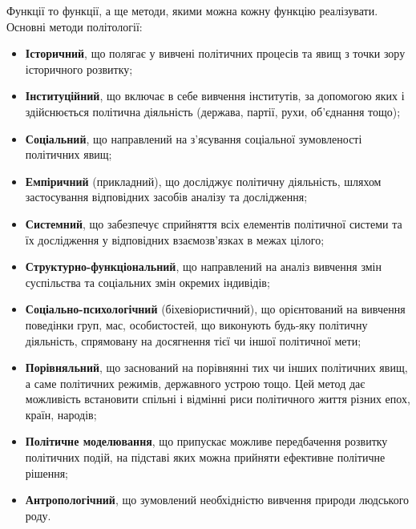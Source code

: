 Функції то функції, а ще методи, якими можна кожну функцію реалізувати. Основні методи політології:
\begin{itemize}
\item {\bf Історичний}, що полягає у вивчені політичних процесів та явищ з точки зору історичного розвитку;
\item {\bf Інституційний}, що включає в себе вивчення інститутів, за допомогою яких і здійснюється політична діяльність (держава, партії, рухи, об’єднання тощо);
\item {\bf Соціальний}, що направлений на з’ясування соціальної зумовленості політичних явищ;
\item {\bf Емпіричний} (прикладний), що досліджує політичну діяльність, шляхом застосування відповідних засобів аналізу та дослідження;
\item {\bf Системний}, що забезпечує сприйняття всіх елементів політичної системи та їх дослідження у відповідних взаємозв’язках в межах цілого;
\item {\bf Структурно-функціональний}, що направлений на аналіз вивчення змін суспільства та соціальних змін окремих індивідів;
\item {\bf Соціально-психологічний} (біхевіористичний), що орієнтований на вивчення поведінки груп, мас, особистостей, що виконують будь-яку політичну діяльність, спрямовану на досягнення тієї чи іншої політичної мети;
\item {\bf Порівняльний}, що заснований на порівнянні тих чи інших політичних явищ, а саме політичних режимів, державного устрою тощо. Цей метод дає можливість встановити спільні і відмінні риси політичного життя різних епох, країн, народів;
\item {\bf Політичне моделювання}, що припускає можливе передбачення розвитку політичних подій, на підставі яких можна прийняти ефективне політичне рішення;
\item {\bf Антропологічний}, що зумовлений необхідністю вивчення природи людського роду.
\end{itemize}
